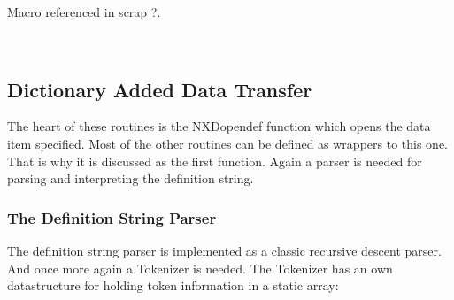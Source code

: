 \documentclass[12pt]{article}
\begin{document}
\begin{flushleft}
\begin{minipage}{\linewidth}
\begin{list}{}{}
\mbox{}\verb@@\\
\mbox{}\verb@     /* copy results home */@\\
\mbox{}\verb@     pPtr = GetCharArray(pResult);@\\
\mbox{}\verb@     strncpy(pBuffer,pPtr,iBufLen);   @\\
\mbox{}\verb@     DeleteDynString(pResult);@\\
\mbox{}\verb@     return NX_OK;@\\
\mbox{}\verb@   }@\\
\mbox{}\verb@@$\diamond$
\end{list}
\vspace{-1ex}
\footnotesize\addtolength{\baselineskip}{-1ex}
\begin{list}{}{\setlength{\itemsep}{-\parsep}\setlength{\itemindent}{-\leftmargin}}
\item Macro referenced in scrap ?.
\end{list}
\end{minipage}\\[4ex]
\end{flushleft}
\subsection{Dictionary Added Data Transfer}
The heart of these routines is the NXDopendef function which opens the data
item specified. Most of the other routines can be defined as wrappers to
this one. That is why it is discussed as the first function. Again a parser
is needed for parsing and interpreting the definition string. 

\subsubsection{The Definition String Parser}
The definition string  parser is implemented as a classic recursive descent 
parser. And once
more again a Tokenizer is needed. The Tokenizer has an own datastructure for
holding token information in a static array:
\end{document}
